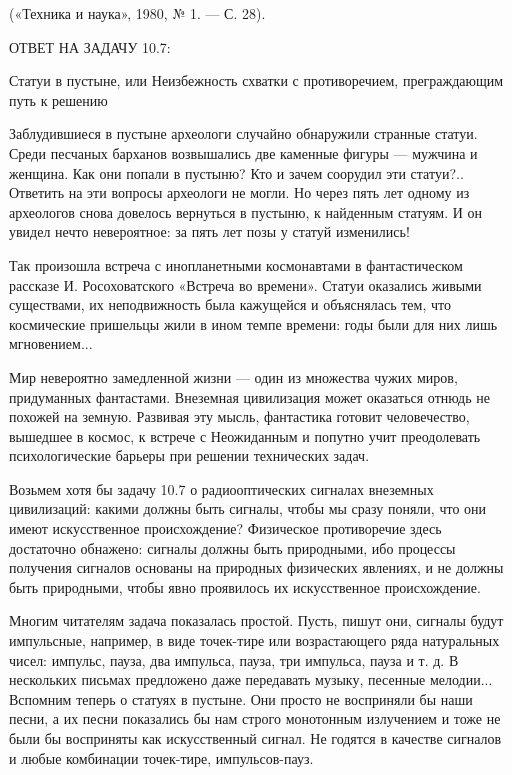 («Техника и наука», 1980, № 1. — С. 28).


ОТВЕТ НА ЗАДАЧУ 10.7:

Статуи   в  пустыне,   или  Неизбежность   схватки  с   противоречием,
преграждающим путь к решению

Заблудившиеся в пустыне археологи случайно обнаружили странные статуи.
Среди песчаных  барханов возвышались две  каменные фигуры —  мужчина и
женщина. Как они попали в пустыню?  Кто и зачем соорудил эти статуи?..
Ответить на эти  вопросы археологи не могли. Но через  пять лет одному
из археологов снова довелось вернуться в пустыню, к найденным статуям.
И он увидел нечто невероятное: за пять лет позы у статуй изменились!

Так произошла  встреча с  инопланетными космонавтами  в фантастическом
рассказе  И. Росоховатского  «Встреча  во  времени». Статуи  оказались
живыми существами, их неподвижность  была кажущейся и объяснялась тем,
что космические пришельцы жили в ином темпе времени: годы были для них
лишь мгновением...

Мир  невероятно замедленной  жизни —  один из  множества чужих  миров,
придуманных фантастами.  Внеземная цивилизация может  оказаться отнюдь
не  похожей   на  земную.  Развивая  эту   мысль,  фантастика  готовит
человечество, вышедшее  в космос,  к встрече  с Неожиданным  и попутно
учит  преодолевать  психологические  барьеры при  решении  технических
задач.

Возьмем  хотя  бы задачу  10.7  о  радиооптических сигналах  внеземных
цивилизаций: какими  должны быть сигналы,  чтобы мы сразу  поняли, что
они имеют  искусственное происхождение? Физическое  противоречие здесь
достаточно  обнажено: сигналы  должны  быть  природными, ибо  процессы
получения  сигналов  основаны  на  природных  физических  явлениях,  и
не  должны быть  природными,  чтобы явно  проявилось их  искусственное
происхождение.

Многим читателям задача показалась  простой. Пусть, пишут они, сигналы
будут импульсные,  например, в виде точек-тире  или возрастающего ряда
натуральных чисел: импульс, пауза,  два импульса, пауза, три импульса,
пауза и т. д. В  нескольких письмах предложено даже передавать музыку,
песенные мелодии... Вспомним теперь о статуях в пустыне. Они просто не
восприняли  бы  наши  песни,  а  их песни  показались  бы  нам  строго
монотонным излучением и  тоже не были бы  восприняты как искусственный
сигнал. Не годятся в качестве  сигналов и любые комбинации точек-тире,
импульсов-пауз.

